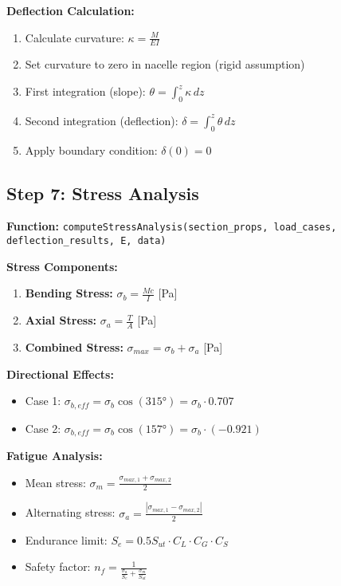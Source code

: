 \documentclass[11pt]{article}
\begin{document}
\textbf{Deflection Calculation:}
\begin{enumerate}
    \item Calculate curvature: $\kappa = \frac{M}{EI}$
    \item Set curvature to zero in nacelle region (rigid assumption)
    \item First integration (slope): $\theta = \int_0^z \kappa \, dz$
    \item Second integration (deflection): $\delta = \int_0^z \theta \, dz$
    \item Apply boundary condition: $\delta(0) = 0$
\end{enumerate}

\subsection{Step 7: Stress Analysis}
\textbf{Function:} \texttt{computeStressAnalysis(section\_props, load\_cases, deflection\_results, E, data)}

\textbf{Stress Components:}
\begin{enumerate}
    \item \textbf{Bending Stress:} $\sigma_b = \frac{Mc}{I}$ [Pa]
    \item \textbf{Axial Stress:} $\sigma_a = \frac{T}{A}$ [Pa]
    \item \textbf{Combined Stress:} $\sigma_{max} = \sigma_b + \sigma_a$ [Pa]
\end{enumerate}

\textbf{Directional Effects:}
\begin{itemize}
    \item Case 1: $\sigma_{b,eff} = \sigma_b \cos(315°) = \sigma_b \cdot 0.707$
    \item Case 2: $\sigma_{b,eff} = \sigma_b \cos(157°) = \sigma_b \cdot (-0.921)$
\end{itemize}

\textbf{Fatigue Analysis:}
\begin{itemize}
    \item Mean stress: $\sigma_m = \frac{\sigma_{max,1} + \sigma_{max,2}}{2}$
    \item Alternating stress: $\sigma_a = \frac{|\sigma_{max,1} - \sigma_{max,2}|}{2}$
    \item Endurance limit: $S_e = 0.5S_{ut} \cdot C_L \cdot C_G \cdot C_S$
    \item Safety factor: $n_f = \frac{1}{\frac{\sigma_a}{S_e} + \frac{\sigma_m}{S_{ut}}}$
\end{itemize}
\end{document}
